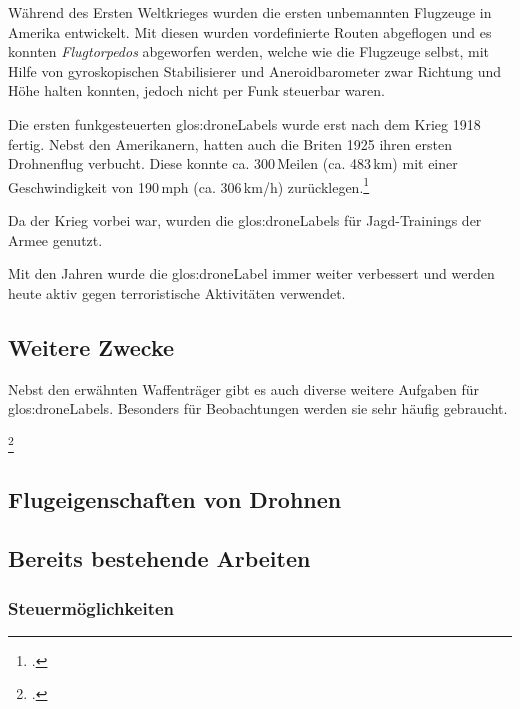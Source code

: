 Während des Ersten Weltkrieges wurden die ersten unbemannten Flugzeuge in Amerika entwickelt.
Mit diesen wurden vordefinierte Routen abgeflogen und es konnten \textit{Flugtorpedos} abgeworfen werden, welche wie die Flugzeuge selbst, mit Hilfe von gyroskopischen Stabilisierer und Aneroidbarometer zwar Richtung und Höhe halten konnten, jedoch nicht per Funk steuerbar waren.

Die ersten funkgesteuerten \glspl{glos:droneLabel} wurde erst nach dem Krieg 1918 fertig. Nebst den Amerikanern, hatten auch die Briten 1925 ihren ersten Drohnenflug verbucht. Diese konnte ca. 300\,Meilen (ca. 483\,km) mit einer Geschwindigkeit von 190\,mph (ca. 306\,km/h) zurücklegen.\footcite{Informatik_und_Gesellschaft_2015-03-21}

Da der Krieg vorbei war, wurden die \glspl{glos:droneLabel} für Jagd-Trainings der Armee genutzt.

Mit den Jahren wurde die \gls{glos:droneLabel} immer weiter verbessert und werden heute aktiv gegen terroristische Aktivitäten verwendet.

\subsection{Weitere Zwecke}
Nebst den erwähnten Waffenträger gibt es auch diverse weitere Aufgaben für \glspl{glos:droneLabel}. Besonders für Beobachtungen werden sie sehr häufig gebraucht.



\footcite{Die_Geschichte_der_Drohnen_DiePresse.com_2015-03-21}










\subsection{Flugeigenschaften von Drohnen}


\subsection{Bereits bestehende Arbeiten}

\subsubsection{Steuermöglichkeiten}

